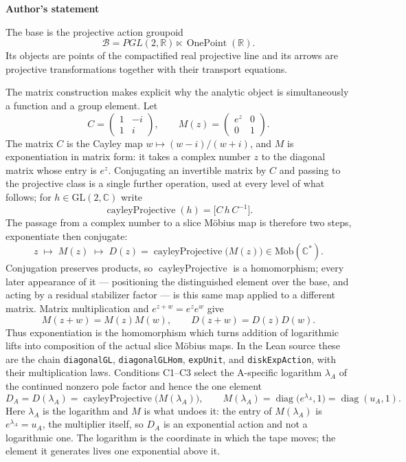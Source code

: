 \documentclass[11pt]{article}
\newcommand{\CC}{\mathbb{C}}
\newcommand{\RR}{\mathbb{R}}
\theoremstyle{plain}
\theoremstyle{definition}
\theoremstyle{remark}
\begin{document}
\begin{tcolorbox}[provenancecard,title={40. Definition - The projective base, genuine section functor, and total category},title after break={40. Definition - The projective base, genuine section functor, and total category (continued)}]
\textbf{Author's statement}\par
The base is the projective action groupoid
\[
  \mathcal B
  =PGL(2,\RR)\ltimes\operatorname{OnePoint}(\RR).
\]
Its objects are points of the compactified real projective line and its arrows are projective
transformations together with their transport equations.

The matrix construction makes explicit why the analytic object is simultaneously a function and a
group element. Let
\[
 C=\begin{pmatrix}1&-i\\[2pt]1&i\end{pmatrix},\qquad
 M(z)=\begin{pmatrix}e^z&0\\[2pt]0&1\end{pmatrix}.
\]
The matrix $C$ is the Cayley map $w\mapsto(w-i)/(w+i)$, and $M$ is
exponentiation in matrix form: it takes a complex number $z$ to the diagonal
matrix whose entry is $e^z$. Conjugating an invertible matrix by $C$ and
passing to the projective class is a single further operation, used at every
level of what follows; for $h\in\mathrm{GL}(2,\CC)$ write
\[
  \operatorname{cayleyProjective}(h)=\bigl[C\,h\,C^{-1}\bigr].
\]
The passage from a complex number to a slice M\"obius map is therefore two
steps, exponentiate then conjugate:
\[
  z\;\longmapsto\;M(z)\;\longmapsto\;
  D(z)=\operatorname{cayleyProjective}\bigl(M(z)\bigr)
      \in\operatorname{M\ddot ob}(\CC^*).
\]
Conjugation preserves products, so $\operatorname{cayleyProjective}$ is a
homomorphism; every later appearance of it --- positioning the distinguished
element over the base, and acting by a residual stabilizer factor --- is this
same map applied to a different matrix. Matrix multiplication and
$e^{z+w}=e^ze^w$ give
\[
  M(z+w)=M(z)M(w),\qquad D(z+w)=D(z)D(w).
\]
Thus exponentiation is the homomorphism which turns addition of logarithmic lifts into composition
of the actual slice M\"obius maps. In the Lean source these are the chain
\texttt{diagonalGL}, \texttt{diagonalGLHom}, \texttt{expUnit}, and
\texttt{diskExpAction}, with their multiplication laws. Conditions \textup{C1--C3} select the
A-specific logarithm $\lambda_A$ of the continued nonzero pole factor and hence the one element
\[
  D_A=D(\lambda_A)=\operatorname{cayleyProjective}\bigl(M(\lambda_A)\bigr),
  \qquad
  M(\lambda_A)=\operatorname{diag}\bigl(e^{\lambda_A},1\bigr)
              =\operatorname{diag}(u_A,1).
\]
Here $\lambda_A$ is the logarithm and $M$ is what undoes it: the entry of
$M(\lambda_A)$ is $e^{\lambda_A}=u_A$, the multiplier itself, so $D_A$ is an
exponential action and not a logarithmic one. The logarithm is the coordinate
in which the tape moves; the element it generates lives one exponential above
it.


\end{tcolorbox}
\end{document}
